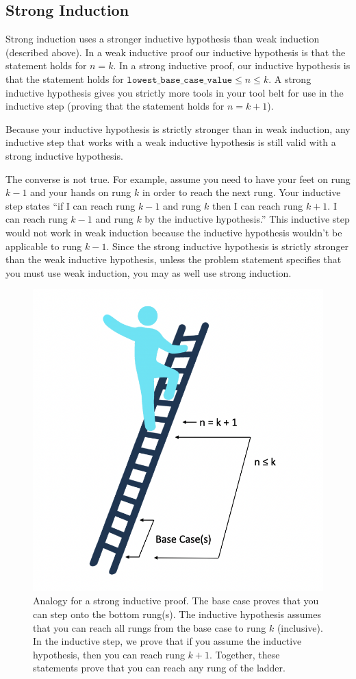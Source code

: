 \documentclass{article}
\theoremstyle{definition}
\begin{document}
\subsection*{Strong Induction}
Strong induction uses a stronger inductive hypothesis than weak induction (described above). In a weak inductive proof our inductive hypothesis is that the statement holds for $n=k$. In a strong inductive proof, our inductive hypothesis is that  the statement holds for $\texttt{lowest\_base\_case\_value} \leq n \leq k$. A strong inductive hypothesis gives you strictly more tools in your tool belt for use in the inductive step (proving that the statement holds for $n=k+1$). 

Because your inductive hypothesis is strictly stronger than in weak induction, any inductive step that works with a weak inductive hypothesis is still valid with a strong inductive hypothesis. 

The converse is not true. For example, assume you need to have your feet on rung $k-1$ and your hands on rung $k$ in order to reach the next rung. Your inductive step states ``if I can reach rung $k-1$ and rung $k$ then I can reach rung $k+1$. I can reach rung $k-1$ and rung $k$ by the inductive hypothesis.'' This inductive step would not work in weak induction because the inductive hypothesis wouldn't be applicable to rung $k-1$. Since the strong inductive hypothesis is strictly stronger than the weak inductive hypothesis, unless the problem statement specifies that you must use weak induction, you may as well use strong induction.

\begin{figure}[h]
	\centering
    \includegraphics[width=0.5\linewidth]{strong-induction.png}
    \captionsetup{labelformat=empty}
    \captionsetup{width=0.7\linewidth}
    \caption{Analogy for a strong inductive proof. The base case proves that you can step onto the bottom rung(s). The inductive hypothesis assumes that you can reach all rungs from the base case to rung $k$ (inclusive). In the inductive step, we prove that if you assume the inductive hypothesis, then you can reach rung $k+1$. Together, these statements prove that you can reach any rung of the ladder.}
    \label{fig:laddder-induction}
\end{figure}
\end{document}
